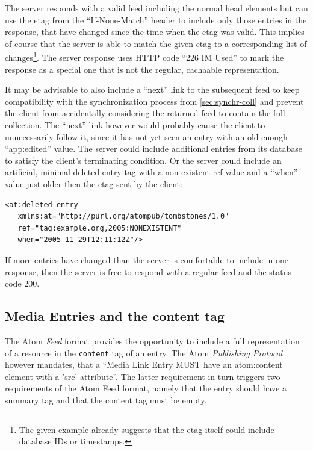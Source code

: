 \documentclass[11pt,a4paper,headsepline,twoside]{scrartcl}		%
\begin{document}
The server responds with a valid feed including the normal head elements but can
use the etag from the ``If-None-Match'' header to include only those entries in
the response, that have changed since the time when the etag was valid. This
implies of course that the server is able to match the given etag to a
corresponding list of changes\footnote{The given example already suggests that
  the etag itself could include database IDs or timestamps.}. The server
response uses HTTP code ``226 IM Used'' \cite{RFC3229} to mark the response as a
special one that is not the regular, cachaable representation.

It may be advisable to also include a ``next'' link to the subsequent feed to keep
compatibility with the synchronization process from \autoref{sec:synchr-coll}
and prevent the client from accidentally considering the returned feed to
contain the full collection. The ``next'' link however would probably cause the
client to unnecessarily follow it, since it has not yet seen an entry with an
old enough ``app:edited'' value. The server could include additional entries
from its database to satisfy the client's terminating condition. Or the server
could include an artificial, minimal
deleted-entry \cite{draft-snell-atompub-tombstones-14} tag with a non-existent
ref value and a ``when'' value just older then the etag sent by the client:

\begin{lstlisting}
<at:deleted-entry
   xmlns:at="http://purl.org/atompub/tombstones/1.0"
   ref="tag:example.org,2005:NONEXISTENT"
   when="2005-11-29T12:11:12Z"/>
\end{lstlisting}

If more entries have changed than the server is comfortable to include in one
response, then the server is free to respond with a regular feed and the status
code 200.

\subsection{Media Entries and the content tag}
\label{sec:inline-feeds-or}

The Atom \textit{Feed} format provides the opportunity to include a full
representation of a resource in the \lstinline:content: tag of an
entry\cite[sec. 4.1.3]{RFC4287}. The Atom \textit{Publishing Protocol} however
mandates, that a ``Media Link Entry MUST have an atom:content element with a
'src' attribute''\cite[sec. 9.6]{RFC5023}. The latter requirement in turn
triggers two requirements of the Atom Feed format, namely that the entry should
have a summary tag and that the content tag must be
empty\cite[sec. 4.1.1.1,4.1.3.2]{RFC4287}.
\end{document}
